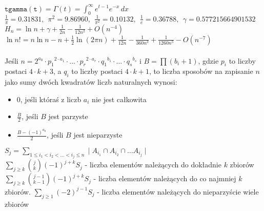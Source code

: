 
\usepackage[utf8]{inputenc}
\usepackage{polski}
\usepackage{amsfonts}
\usepackage{amsmath,amssymb}

\DeclareMathOperator{\sech}{sech}
\DeclareMathOperator{\csch}{csch}
\DeclareMathOperator{\arcsec}{arcsec}
\DeclareMathOperator{\arccsc}{arcCsc}
\DeclareMathOperator{\arccosh}{arcCosh}
\DeclareMathOperator{\arcsinh}{arcsinh}
\DeclareMathOperator{\arctanh}{arctanh}
\DeclareMathOperator{\arcsech}{arcsech}
\DeclareMathOperator{\arccsch}{arcCsch}
\DeclareMathOperator{\arccoth}{arcCoth} 

  \( \mathtt{tgamma(t)} = \Gamma(t) = \int_0^{\infty} e^{t-1} e^{-x} \,dx \) \\
  \( \frac1{\pi} = 0.31831,\ \ \pi^2 = 9.86960,\ \ \frac1{\pi^2} = 0.10132,\ \ \frac1e = 0.36788,
  \ \ \gamma = 0.577215664901532\) \\
  \( H_n = \ln n + \gamma + \frac1{2n} - \frac1{12n^2} + O(n^{-4}) \) \\
  \( \ln n! = n \ln n - n + \frac12 \ln(2 \pi n) + \frac1{12n} - \frac1{360n^3} + \frac1{1260n^5}
  - O(n^{-7}) \)
  \\ 
  \\
	Jeśli $n=2^{a_0} \cdot {p_1}^{2 \cdot a_1} \cdot ... \cdot {p_r}^{2 \cdot a_r} \cdot {q_1}^{b_1} \cdot ... \cdot {q_s}^{b_s}$ i $B= \prod (b_i+1)$, gdzie $p_i$ to liczby postaci $4 \cdot k + 3$, a $q_i$ to liczby postaci $4 \cdot k + 1$, to liczba sposobów na zapisanie $n$ jako sumy dwóch kwadratów liczb naturalnych wynosi:
      \begin{itemize}
        \item 0, jeśli któraś z liczb $a_i$ nie jest całkowita
        \item $\frac{B}{2}$, jeśli $B$ jest parzyste
        \item $\frac{B-(-1)^{a_0}}{2}$, jeśli $B$ jest nieparzyste
      \end{itemize}
      
$S_j = \sum\limits_{1\leq i_1<i_2<\ldots<i_j\leq n} \mid A_{i_1}\cap A_{i_2} \cap \ldots A_{i_j} \mid$\\
$\sum\limits_{j\geq k}{j \choose k}(-1)^{j + k}S_j$ - liczba elementów należących do dokładnie $k$ zbiorów\\
$\sum\limits_{j\geq k}{j - 1 \choose k - 1}(-1)^{j + k}S_j$ - liczba elementów należących do co najmniej $k$ zbiorów.
$\sum\limits_{j\geq 1}(-2)^{j-1}S_j$ - liczba elementów należących do nieparzyście wiele zbiorów

